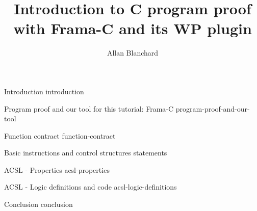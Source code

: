 \documentclass[middle]{zmdocument}
\title{Introduction to C program proof with Frama-C and its WP plugin}
\author{Allan Blanchard}
\begin{document}
\maketitle
\tableofcontents

\begin{levelOne}
  {Introduction}
  {introduction}
\end{levelOne}

\begin{levelOne}
  {Program proof and our tool for this tutorial: Frama-C}
  {program-proof-and-our-tool}
\end{levelOne}

\begin{levelOne}
  {Function contract}
  {function-contract}
\end{levelOne}

\begin{levelOne}
  {Basic instructions and control structures}
  {statements}
\end{levelOne}

\begin{levelOne}
  {ACSL - Properties}
  {acsl-properties}
\end{levelOne}


\begin{levelOne}
  {ACSL - Logic definitions and code}
  {acsl-logic-definitions}
\end{levelOne}


\begin{levelOne}
  {Conclusion}
  {conclusion}
\end{levelOne}
\end{document}
